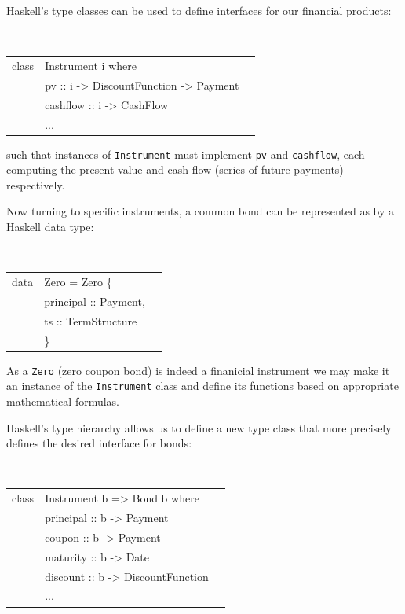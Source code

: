 \documentclass[11pt]{article}
\begin{document}
Haskell's type classes can be used to define interfaces for our financial products:

\begin{center}
\tt
\begin{tabular}{lll}
class & Instrument i where\\
      &\hspace{-1cm} pv       :: i -> DiscountFunction -> Payment\\
      &\hspace{-1cm} cashflow :: i -> CashFlow\\
      &\hspace{-1cm} ...\\
\end{tabular}
\end{center}

such that instances of {\tt Instrument} must implement {\tt pv} and {\tt cashflow}, each
computing the present value and cash flow (series of future payments) respectively.

Now turning to specific instruments, a common bond can be represented as by a
Haskell data type:

\begin{center}
\tt
\begin{tabular}{lll}
data & Zero = Zero \{\\
      &\hspace{-1cm} principal :: Payment,\\
      &\hspace{-1cm} ts :: TermStructure\\
      &\hspace{-0.8cm}\}
\end{tabular}
\end{center}

As a {\tt Zero} (zero coupon bond) is indeed a finanicial instrument we may make it an instance of
the {\tt Instrument} class and define its functions based on appropriate mathematical
formulas.

Haskell's type hierarchy allows us to define a new type class that more precisely
defines the desired interface for bonds:

\begin{center}
\tt
\begin{tabular}{lll}
class & Instrument b => Bond b where\\
      &\hspace{-1cm} principal :: b -> Payment\\
      &\hspace{-1cm} coupon    :: b -> Payment\\
      &\hspace{-1cm} maturity  :: b -> Date\\
      &\hspace{-1cm} discount  :: b -> DiscountFunction\\
      &\hspace{-1cm} ...\\
\end{tabular}
\end{center}
\end{document}

